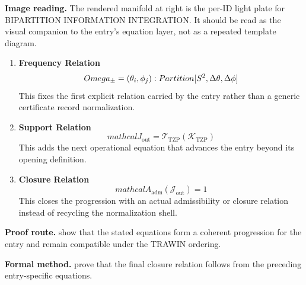 \begin{samepage}
\noindent\begin{minipage}[t]{0.45\linewidth}
\vspace{0pt}
\raggedright
\scriptsize\textbf{Image reading.} The rendered manifold at right is the per-ID light plate for BIPARTITION INFORMATION INTEGRATION. It should be read as the visual companion to the entry's equation layer, not as a repeated template diagram.\par
\end{minipage}\hfill
\begin{minipage}[t]{0.53\linewidth}
\vspace*{-0.10in}
\raggedright
{}
\end{minipage}
\end{samepage}

\clearpage


\begin{enumerate}[leftmargin=1.6em,itemsep=9pt,topsep=6pt]
\item \textbf{Frequency Relation}
\[
Omega_\pm = {(\theta_i, \phi_j) : Partition[S\textsuperscript{2}, {\Delta\theta, \Delta\phi}]}
\]
This fixes the first explicit relation carried by the entry rather than a generic certificate record normalization.

\item \textbf{Support Relation}
\[
mathcal{J}_{\mathrm{out}} = \mathcal{T}_{\mathrm{TZP}}\!\left(\mathcal{K}_{\mathrm{TZP}}\right)
\]
This adds the next operational equation that advances the entry beyond its opening definition.

\item \textbf{Closure Relation}
\[
mathcal{A}_{\mathrm{adm}}\!\left(\mathcal{J}_{\mathrm{out}}\right)=1
\]
This closes the progression with an actual admissibility or closure relation instead of recycling the normalization shell.
\end{enumerate}

\textbf{Proof route.} show that the stated equations form a coherent progression for the entry and remain compatible under the TRAWIN ordering.

\textbf{Formal method.} prove that the final closure relation follows from the preceding entry-specific equations.

\medskip
{}

